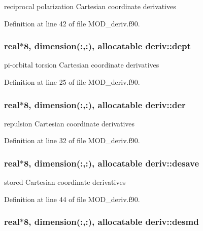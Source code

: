 reciprocal polarization Cartesian coordinate derivatives 



Definition at line 42 of file M\-O\-D\-\_\-deriv.\-f90.

\hypertarget{classderiv_ac3d9dddf5a57575b5fa0a8668554cc0b}{
\subsubsection[{dept}]{\setlength{\rightskip}{0pt plus 5cm}real$\ast$8, dimension(\-:,\-:), allocatable deriv\-::dept}}\label{classderiv_ac3d9dddf5a57575b5fa0a8668554cc0b}


pi-\/orbital torsion Cartesian coordinate derivatives 



Definition at line 25 of file M\-O\-D\-\_\-deriv.\-f90.

\hypertarget{classderiv_a78988c04c9c26c2471a265d2e4793726}{
\subsubsection[{der}]{\setlength{\rightskip}{0pt plus 5cm}real$\ast$8, dimension(\-:,\-:), allocatable deriv\-::der}}\label{classderiv_a78988c04c9c26c2471a265d2e4793726}


repulsion Cartesian coordinate derivatives 



Definition at line 32 of file M\-O\-D\-\_\-deriv.\-f90.

\hypertarget{classderiv_a725a18c2a6db9a96ba1b2e4b86256617}{
\subsubsection[{desave}]{\setlength{\rightskip}{0pt plus 5cm}real$\ast$8, dimension(\-:,\-:), allocatable deriv\-::desave}}\label{classderiv_a725a18c2a6db9a96ba1b2e4b86256617}


stored Cartesian coordinate derivatives 



Definition at line 44 of file M\-O\-D\-\_\-deriv.\-f90.

\hypertarget{classderiv_a64aef9d688475a6de56080c342300aa2}{
\subsubsection[{desmd}]{\setlength{\rightskip}{0pt plus 5cm}real$\ast$8, dimension(\-:,\-:), allocatable deriv\-::desmd}}\label{classderiv_a64aef9d688475a6de56080c342300aa2}


